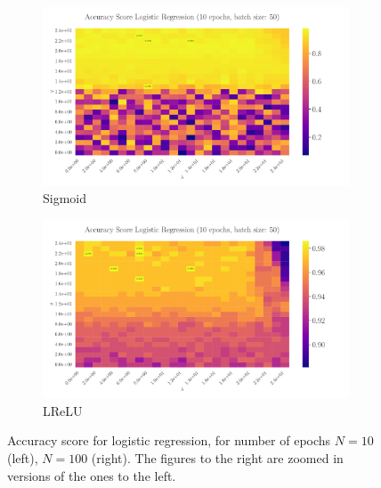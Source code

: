\documentclass[%
reprint,
amsmath,amssymb,
aps,
]{revtex4-2}
\begin{document}
\begin{figure}
\begin{subfigure}{0.497\textwidth}
		\includegraphics[width=\textwidth]{Python/Figures/LogReg25x25_epoch10_batchS50.pdf}
		\caption{Sigmoid}
		\label{fig:LogReg25x25_epoch100_bacthS50}
	\end{subfigure}
	\hfill
	\begin{subfigure}{0.497\textwidth}
		\includegraphics[width=\textwidth]{Python/Figures/LogReg25x25_epoch10_batchS50_zoomed.pdf}
		\caption{LReLU}
		\label{fig:LogReg25x25_epoch100_bacthS50_zoomed}
	\end{subfigure}
	\caption{Accuracy score for logistic regression, for number of epochs \(N=10\) (left), \(N=100\) (right). The figures to the right are zoomed in versions of the ones to the left.}
	\label{fig:LogReg}
\end{figure}
\end{document}
